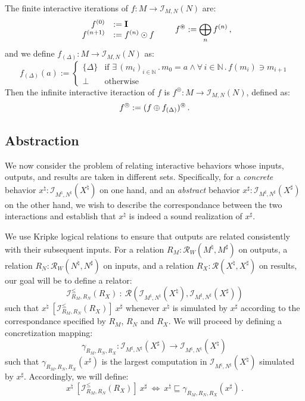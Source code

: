 \documentclass[acmsmall,timestamp,review,anonymous]{acmart}
\newcommand{\ifr}[1]{\ [{#1}]\ }
\begin{document}
\begin{definition}
The finite interactive iterations
of $f : M \rightarrow \mathcal{I}_{M,N}(N)$
are:
\[
    \begin{array}{rl}
      f^{(0)} &:= \mathbf{I} \\
      f^{(n+1)} &:= f^{(n)} \odot f
    \end{array}
    \qquad
    f^\oast := \bigoplus_n f^{(n)} \,,
\]
and we define
$f_{(\Delta)} : M \rightarrow \mathcal{I}_{M,N}(N)$
as:
\[
    f_{(\Delta)}(a) :=
    \begin{cases}
      \{ \Delta \} &\mbox{if }
        \exists \, (m_i)_{i \in \mathbb{N}} \,.\,
        m_0 = a \wedge
        \forall \, i \in \mathbb{N} \,.\,
        f(m_i) \ni m_{i+1} \\
      \bot &\mbox{otherwise}
    \end{cases}
\]
Then the infinite interactive iteraction of $f$ is
$f^\circledcirc : M \rightarrow \mathcal{I}_{M,N}(N)$, defined as:
\[
    f^\circledcirc := (f \oplus f_{(\Delta)})^\oast \,.
\]
\end{definition}


\subsection{Abstraction} \label{sec:monad:abs} %

We now consider the problem of relating interactive behaviors
whose inputs, outputs, and results are taken in different sets.
Specifically,
for a \emph{concrete} behavior
$x^\natural : \mathcal{I}_{M^\natural,N^\natural}(X^\natural)$
on one hand, and an \emph{abstract} behavior
$x^\sharp : \mathcal{I}_{M^\sharp,N^\sharp}(X^\sharp)$
on the other hand,
we wish to describe the correspondance between
the two interactions
and establish that
$x^\natural$ is indeed a sound realization of $x^\sharp$.

We use Kripke logical relations to ensure that
outputs are related consistently with their subsequent inputs.
For
a relation $R_M : \mathcal{R}_W(M^\natural, M^\sharp)$ on outputs,
a relation $R_N : \mathcal{R}_W(N^\natural, N^\sharp)$ on inputs,
and a relation $R_X : \mathcal{R}(X^\natural, X^\sharp)$ on results,
our goal will be to define a relator:
\[ \mathcal{I}^\le_{R_M,R_N}(R_X) \: : \:
   \mathcal{R}(\mathcal{I}_{M^\natural,N^\natural}(X^\natural),
               \mathcal{I}_{M^\sharp,N^\sharp}(X^\sharp)) \]
such that $x^\natural \ifr{\mathcal{I}^\le_{R_M,R_N}(R_X)} x^\sharp$
whenever $x^\natural$ is simulated by $x^\sharp$ according to
the correspondance specified by $R_M$, $R_N$ and $R_X$.
We will proceed by defining a concretization mapping:
\[ \gamma_{R_M,R_N,R_X} : \mathcal{I}_{M^\sharp,N^\sharp}(X^\sharp) \rightarrow
                    \mathcal{I}_{M^\natural,N^\natural}(X^\natural) \, \]
such that $\gamma_{R_M, R_N, R_X}(x^\sharp)$ is
the largest computation in $\mathcal{I}_{M^\natural,N^\natural}(X^\natural)$
simulated by $x^\sharp$.
Accordingly,
we will define:
\[ x^\natural \ifr{\mathcal{I}^\le_{R_M,R_N}(R_X)} x^\sharp
   \: \Leftrightarrow \:
   x^\natural \sqsubseteq \gamma_{R_M,R_N,R_X}(x^\sharp) \,. \]
\end{document}
